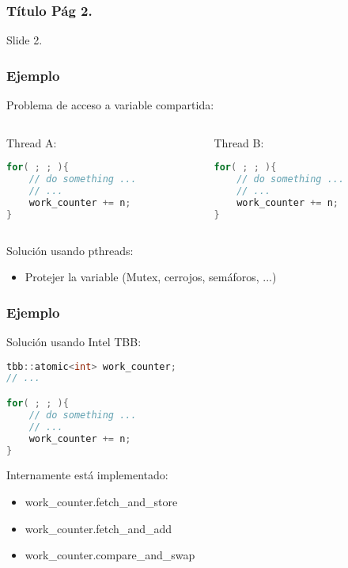 \documentclass[10pt]{beamer}
\begin{document}
\begin{frame}
  \frametitle{Título Pág 2.}
  Slide 2.
\end{frame}


\begin{frame}[fragile] %
  \frametitle{Ejemplo}
  \alert{Problema} de acceso a variable compartida:
  \begin{columns}
    \begin{column}{0.45\textwidth}
      \center Thread A:
      \begin{lstlisting}[language=C++, frame=single]
for( ; ; ){
    // do something ...
    // ...
    work_counter += n;
}
      \end{lstlisting}
    \end{column}
    \begin{column}{0.45\textwidth}
      \center Thread B:
      \begin{lstlisting}[language=C++, frame=single]
for( ; ; ){
    // do something ...
    // ...
    work_counter += n;
}
      \end{lstlisting}
    \end{column}
  \end{columns}
  \alert{Solución} usando pthreads:
  \begin{itemize}
  \item Protejer la variable (Mutex, cerrojos, semáforos, ...)
  \end{itemize}
\end{frame}

\begin{frame}[fragile] %
  \frametitle{Ejemplo}
  \alert{Solución} usando Intel TBB:

  \begin{lstlisting}[language=C++, frame=single]
tbb::atomic<int> work_counter;
// ...

for( ; ; ){
    // do something ...
    // ...
    work_counter += n;
}
  \end{lstlisting}
  Internamente está implementado:
  \begin{itemize}
  \item work\_counter.fetch\_and\_store
  \item work\_counter.fetch\_and\_add
  \item work\_counter.compare\_and\_swap
  \end{itemize}
\end{frame}
\end{document}
